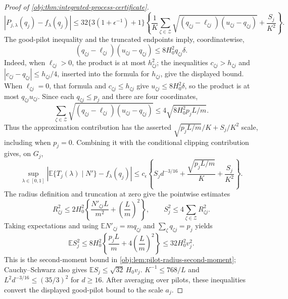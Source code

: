 \documentclass[11pt]{article}
\begin{document}
\begin{proof}[Proof of \cref{obj:thm:integrated-process-certificate}]
\[
|P_{j,\lambda}(q_j)-f_\lambda(q_j)|
\leq32\{3(1+\epsilon^{-1})+1\}
\left\{
\frac1K\sum_{\zeta\in\mathcal Z}
\sqrt{(q_{\zeta j}-\ell_{\zeta j})(u_{\zeta j}-q_{\zeta j})}
+\frac{S_j}{K^2}\right\}.
\]
The good-pilot inequality and the truncated endpoints imply, coordinatewise,
\[
(q_{\zeta j}-\ell_{\zeta j})(u_{\zeta j}-q_{\zeta j})
\leq8H_0^2q_{\zeta j}\delta.
\]
Indeed, when \(\ell_{\zeta j}>0\), the product is at most \(h_{\zeta j}^2\); the inequalities \(c_{\zeta j}>h_{\zeta j}\) and \(|c_{\zeta j}-q_{\zeta j}|\leq h_{\zeta j}/4\), inserted into the formula for \(h_{\zeta j}\), give the displayed bound. When \(\ell_{\zeta j}=0\), that formula and \(c_{\zeta j}\leq h_{\zeta j}\) give \(u_{\zeta j}\leq8H_0^2\delta\), so the product is at most \(q_{\zeta j}u_{\zeta j}\). Since each \(q_{\zeta j}\leq p_j\) and there are four coordinates,
\[
\sum_{\zeta\in\mathcal Z}
\sqrt{(q_{\zeta j}-\ell_{\zeta j})(u_{\zeta j}-q_{\zeta j})}
\leq4\sqrt{8H_0^2p_jL/m}.
\]
Thus the approximation contribution has the asserted \(\sqrt{p_jL/m}/K+S_j/K^2\) scale, including when \(p_j=0\). Combining it with the conditional clipping contribution gives, on \(G_j\),
\[
\sup_{\lambda\in[0,1]}
\left|\mathbb E\{T_j(\lambda)\mid N'\}-f_\lambda(q_j)\right|
 \leq c_\epsilon\left\{
 S_jd^{-3/16}
 +\frac{\sqrt{p_jL/m}}K+\frac{S_j}{K^2}\right\}.
\]
The radius definition and truncation at zero give the pointwise estimates
\[
R_{\zeta j}^{2}
\leq2H_0^2\left\{\frac{N'_{\zeta j}L}{m^2}
+\left(\frac Lm\right)^2\right\},
\qquad
S_j^2\leq4\sum_{\zeta\in\mathcal Z}R_{\zeta j}^2.
\]
Taking expectations and using \(\mathbb E N'_{\zeta j}=m q_{\zeta j}\) and \(\sum_\zeta q_{\zeta j}=p_j\) yields
\[
\mathbb E S_j^2
\leq8H_0^2\left\{\frac{p_jL}{m}
+4\left(\frac Lm\right)^2\right\}
\leq32H_0^2v_j^2.
\]
This is the second-moment bound in \cref{obj:lem:pilot-radius-second-moment}; Cauchy–Schwarz also gives \(\mathbb E S_j\leq\sqrt{32}\,H_0v_j\).
\(K^{-1}\leq768/L\) and \(L^2d^{-3/16}\leq(35/3)^2\) for \(d\geq16\). After averaging over pilots, these inequalities convert the displayed good-pilot bound to the scale \(a_j\).


\end{proof}
\end{document}
